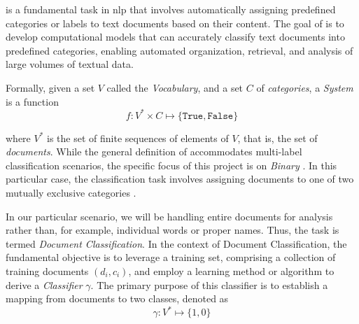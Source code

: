 \label{02_text_classification}

\textclassification{} is a fundamental task in \gls{nlp} that involves automatically assigning predefined categories or labels to text documents based on their content. The goal of \textclassification{} is to develop computational models that can accurately classify text documents into predefined categories, enabling automated organization, retrieval, and analysis of large volumes of textual data.

Formally, given a set $V$ called the \emph{Vocabulary}, and a set $C$ of \emph{categories}, a \emph{\textclassification{} System} is a function 
$$f: V^*\times C \mapsto \{ \texttt{True}, \texttt{False} \}$$

where $V^*$ is the set of finite sequences of elements of $V$, that is, the set of \emph{documents}. 
While the general definition of \textclassification{} accommodates multi-label classification scenarios, the specific focus of this project is on \emph{Binary \textclassification{}}. In this particular case, the classification task involves assigning documents to one of two mutually exclusive categories 
.

In our particular scenario, we will be handling entire documents for analysis rather than, for example, individual words or proper names. Thus, the task is termed \emph{Document Classification}.
In the context of Document Classification, the fundamental objective is to leverage a training set, comprising a collection of training documents $(d_i, c_i)$, and employ a learning method or algorithm to derive a \emph{Classifier} $\gamma$. The primary purpose of this classifier is to establish a mapping from documents to two classes, denoted as 
$$\gamma : V^* \mapsto \{1, 0\}$$

